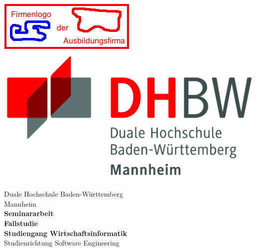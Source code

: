 \begin{titlepage}
\begin{minipage}{\textwidth}
		\vspace{-2cm}
		\noindent \includegraphics[scale=0.71]{img/firmenlogo.jpg} \hfill   \includegraphics{img/logo.jpg}
\end{minipage}
\vspace{1em}
\sffamily
\begin{center}
	\textsf{\large{}Duale Hochschule Baden-W\"urttemberg\\[1.5mm] Mannheim}\\[2em]
	\textsf{\textbf{\Large{}Seminararbeit}}\\[3mm]
	\textsf{\textbf{Fallstudie}} \\[1.5cm]
	\textsf{\textbf{\Large{}Studiengang Wirtschaftsinformatik}\\[3mm] \textsf{Studienrichtung Software Engineering}}
	
	\vspace{3em}
\vfill

\begin{minipage}{\textwidth}


\end{minipage}
\end{center}
\end{titlepage}

